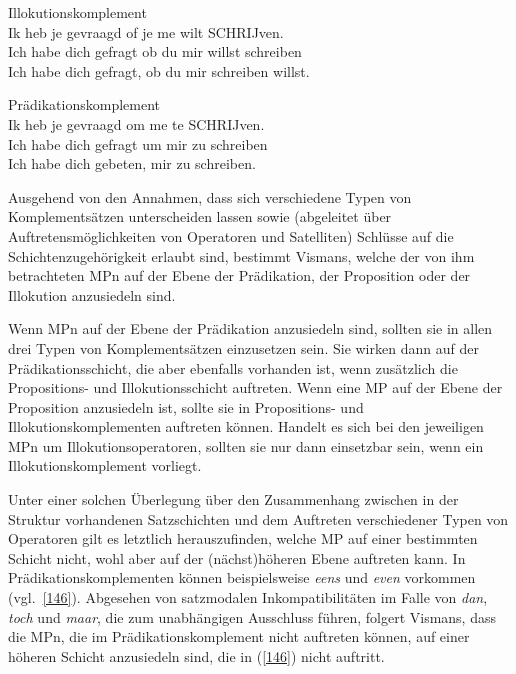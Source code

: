 \begin{exe}
	\ex\label{144}
	Illokutionskomplement\\
	\gll Ik heb je gevraagd of je me wilt SCHRIJven.\\
	Ich habe dich gefragt ob du mir willst schreiben\\
	\glt Ich habe dich gefragt, ob du mir schreiben willst.	
\end{exe}

\begin{exe}
	\ex\label{145}
	Prädikationskomplement\\
	\gll Ik heb je gevraagd om me te SCHRIJven.\\
	Ich habe dich gefragt um mir zu schreiben\\
	\glt Ich habe dich gebeten, mir zu schreiben.	
	\hbox{}\hfill\hbox{\citet[156]{Vismans1994}}
\end{exe}		
Ausgehend von den Annahmen, dass sich verschiedene Typen von Komplement\-sätzen unterscheiden lassen sowie (abgeleitet über Auftretensmöglichkeiten von Operatoren und Satelliten) Schlüsse auf die Schichtenzugehörigkeit erlaubt sind, bestimmt Vismans, welche der von ihm betrachteten MPn auf der Ebene der Prädikation, der Proposition oder der Illokution anzusiedeln sind.\largerpage

Wenn MPn auf der Ebene der Prädikation anzusiedeln sind, sollten sie in allen drei Typen von Komplementsätzen einzusetzen sein. Sie wirken  dann auf der Prädikationsschicht, die aber ebenfalls vorhanden ist, wenn zusätzlich die Proposi\-tions- und Illokutionsschicht auftreten. Wenn eine MP auf der Ebene der Proposition anzusiedeln ist, sollte sie in Propositions- und Illokutionskomplementen  auftreten können. Handelt es sich bei den jeweiligen MPn um Illokutionsope\-ratoren, sollten sie  nur dann einsetzbar sein, wenn ein Illokutionskomplement vorliegt.

Unter einer solchen Überlegung über den Zusammenhang zwischen in der Struktur vorhandenen Satzschichten und dem Auftreten verschiedener Typen von Operatoren gilt es letztlich herauszufinden, welche MP auf einer bestimmten Schicht nicht, wohl aber auf der (nächst)höhe\-ren Ebene auftreten kann. In Prädikationskomplementen  können beispielsweise \textit{eens} und \textit{even} vorkommen (vgl.\ \ref{146}). Abgesehen von satzmodalen Inkompatibilitäten im Falle von \textit{dan}, \textit{toch} und \textit{maar}, die zum unabhängigen Ausschluss führen, folgert Vismans, dass die MPn, die im Prädikationskomplement  nicht auftreten können, auf einer höhe\-ren Schicht anzusiedeln sind, die in (\ref{146}) nicht auftritt.

